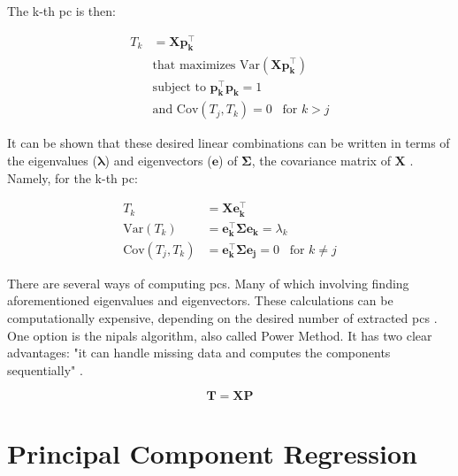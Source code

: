 The k-th \acrshort{pc} is then:

\begin{equation}
	\label{eqn:pca-pck}
	\begin{split}
		T_k & =\mathbf{Xp_k^\intercal} \\
		& \text{that maximizes Var}(\mathbf{Xp_k^\intercal}) \\
		& \text{subject to }  \mathbf{p_k^\intercal p_k} = 1 \\
		& \text{and } \text{Cov}(T_j, T_k) = 0 \;\;\; \text{for } k>j
	\end{split}
\end{equation}

It can be shown that these desired linear combinations can be written in terms of the eigenvalues ($\mathbf{\lambda}$) and eigenvectors ($\mathbf{e}$) of $\mathbf{\Sigma}$, the covariance matrix of $\mathbf{X}$ \parencite{johnson2013applied}. Namely, for the k-th \acrshort{pc}:

\begin{equation}
	\label{eqn:pca-eigen}
	\begin{split}
		T_k & =\mathbf{Xe_k^\intercal} \\
		\text{Var}(T_k)& =  \mathbf{e_k^\intercal \Sigma e_k}=\lambda_k \\
		\text{Cov}(T_j, T_k)& = \mathbf{e_k^\intercal \Sigma e_j}= 0 \;\;\; \text{for } k\neq j
	\end{split}
\end{equation}

There are several ways of computing \acrshort{pc}s. Many of which involving finding aforementioned eigenvalues and eigenvectors. These calculations can be computationally expensive, depending on the desired number of extracted \acrshort{pc}s \parencite{bishop2006pattern}. One option is the \acrfull{nipals} algorithm, also called Power Method. It has two clear advantages: "it can handle missing data and computes the components sequentially" \parencite{dunn2021pid}.







\begin{equation}
	\label{eqn:pca}
	\mathbf{T=XP}
\end{equation}

\section{Principal Component Regression}
\label{sec:pcr}

